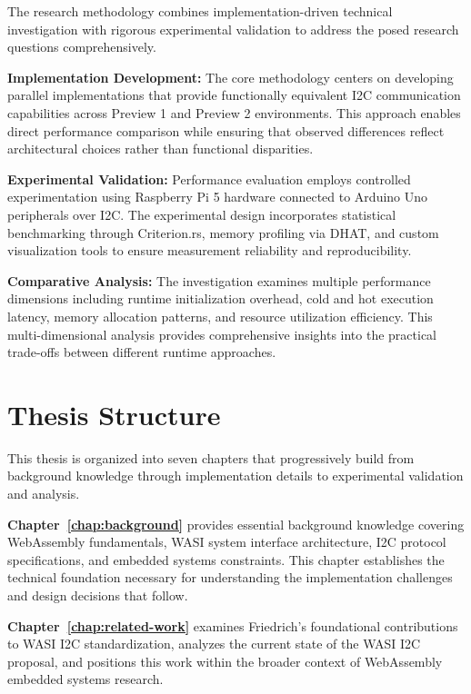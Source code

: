 The research methodology combines implementation-driven technical investigation with rigorous experimental validation to address the posed research questions comprehensively.

\textbf{Implementation Development:} The core methodology centers on developing parallel implementations that provide functionally equivalent I2C communication capabilities across Preview 1 and Preview 2 environments. This approach enables direct performance comparison while ensuring that observed differences reflect architectural choices rather than functional disparities.

\textbf{Experimental Validation:} Performance evaluation employs controlled experimentation using Raspberry Pi 5 hardware connected to Arduino Uno peripherals over I2C. The experimental design incorporates statistical benchmarking through Criterion.rs, memory profiling via DHAT, and custom visualization tools to ensure measurement reliability and reproducibility.

\textbf{Comparative Analysis:} The investigation examines multiple performance dimensions including runtime initialization overhead, cold and hot execution latency, memory allocation patterns, and resource utilization efficiency. This multi-dimensional analysis provides comprehensive insights into the practical trade-offs between different runtime approaches.


\section{Thesis Structure}
\label{sec:thesis-structure}

This thesis is organized into seven chapters that progressively build from background knowledge through implementation details to experimental validation and analysis.

\textbf{Chapter~\ref{chap:background}} provides essential background knowledge covering WebAssembly fundamentals, WASI system interface architecture, I2C protocol specifications, and embedded systems constraints. This chapter establishes the technical foundation necessary for understanding the implementation challenges and design decisions that follow.

\textbf{Chapter~\ref{chap:related-work}} examines Friedrich's foundational contributions to WASI I2C standardization, analyzes the current state of the WASI I2C proposal, and positions this work within the broader context of WebAssembly embedded systems research.

